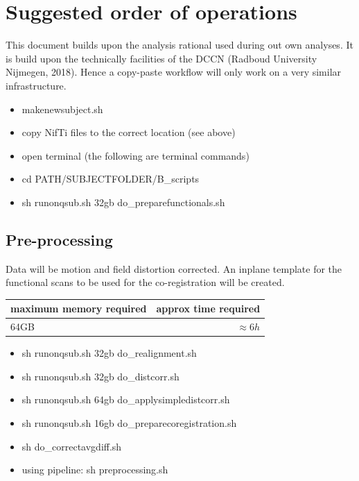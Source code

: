 \documentclass[12pt,a4paper]{scrartcl}
\begin{document}
\section{Suggested order of operations}
This document builds upon the analysis rational used during out own analyses. It is build upon the technically facilities of the DCCN (Radboud University Nijmegen, 2018). Hence a copy-paste workflow will only work on a very similar infrastructure.
\begin{itemize}
\item makenewsubject.sh
\item copy NifTi files to the correct location (see above)
\item open terminal (the following are terminal commands)
\item cd PATH/SUBJECTFOLDER/B\_scripts
\item sh runonqsub.sh 32gb do\_preparefunctionals.sh
\end{itemize}
\subsection{Pre-processing}
Data will be motion and field distortion corrected. An inplane template for the functional scans to be used for the co-registration  will be created.
\begin{table}[h]
\begin{tabular}{l | r}
\toprule
maximum memory required & approx time required\\\toprule
64GB & $\approx 6h$ \\\bottomrule
\end{tabular}
\end{table}
\begin{itemize}
\item sh runonqsub.sh 32gb do\_realignment.sh
\item sh runonqsub.sh 32gb do\_distcorr.sh
\item sh runonqsub.sh 64gb do\_applysimpledistcorr.sh
\item sh runonqsub.sh 16gb do\_preparecoregistration.sh
\item sh do\_correctavgdiff.sh
\item using pipeline: sh preprocessing.sh
\end{itemize}
\end{document}
